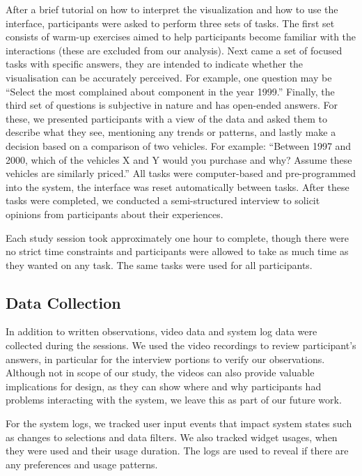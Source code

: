 After a brief tutorial on how to interpret the visualization and how to use the
interface, participants were asked to perform three sets of tasks. The first set
consists of warm-up exercises aimed to help participants become familiar with the 
interactions (these are excluded from our analysis). Next came a set of
focused tasks with specific answers, they are intended to indicate whether the
\threed visualisation can be accurately perceived. For example, one question may
be ``Select the most complained about component in the year 1999.'' Finally,
the third set of questions is subjective in nature and has open-ended answers.
For these, we presented participants with a view of the data and asked them to
describe what they see, mentioning any trends or patterns, and lastly make a
decision based on a comparison of two vehicles. For example: ``Between 1997 and
2000, which of the vehicles X and Y would you purchase and why? Assume these vehicles are
similarly priced.'' All tasks were computer-based and pre-programmed into the system, 
the interface was reset automatically between tasks. After these tasks were completed, 
we conducted a semi-structured interview to solicit opinions from participants about their experiences.  

Each study session took approximately one hour to complete, though there were no
strict time constraints and participants were allowed to take as much time as
they wanted on any task. The same tasks were used for all
participants. 


\subsection{Data Collection}
In addition to written observations, video data and system log data were 
collected during the sessions. We used the video recordings to review 
participant's answers, in particular for the interview portions to verify 
our observations. Although not in scope of our study, the videos can also provide 
valuable implications for design, as they can show where and why participants had 
problems interacting with the system, we leave this as part of our future work. 

For the system logs, we tracked user input events that impact system states such
as changes to selections and data filters. We also tracked widget usages, when they were used and
their usage duration. The logs are used to reveal if there are any preferences and usage 
patterns.
 

